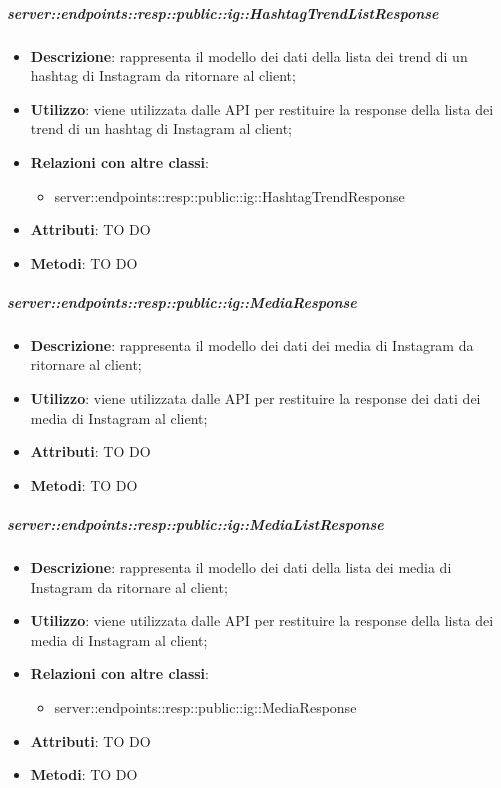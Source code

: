     \subparagraph{server::endpoints::resp::public::ig::HashtagTrendListResponse} %
    \label{subp:bdsm_app_server_endpoints_resp_public_ig_hashtagtrendlistresponse}
    \begin{itemize}
      \item \textbf{Descrizione}: rappresenta il modello dei dati della lista dei trend di un hashtag di Instagram da ritornare al client;
      \item \textbf{Utilizzo}: viene utilizzata dalle API per restituire la response della lista dei trend di un hashtag di Instagram al client;
      \item \textbf{Relazioni con altre classi}:
        \begin{itemize}
          \item server::endpoints::resp::public::ig::HashtagTrendResponse
        \end{itemize}
	  \item \textbf{Attributi}: TO DO
	  \item \textbf{Metodi}: TO DO
      \end{itemize}

    \subparagraph{server::endpoints::resp::public::ig::MediaResponse} %
    \label{subp:bdsm_app_server_endpoints_resp_public_ig_mediaresponse}
    \begin{itemize}
      \item \textbf{Descrizione}: rappresenta il modello dei dati dei media di Instagram da ritornare al client;
      \item \textbf{Utilizzo}: viene utilizzata dalle API per restituire la response dei dati dei media di Instagram al client;
      
	  \item \textbf{Attributi}: TO DO
	  \item \textbf{Metodi}: TO DO
      \end{itemize}

    \subparagraph{server::endpoints::resp::public::ig::MediaListResponse} %
    \label{subp:bdsm_app_server_endpoints_resp_public_ig_medialistresponse}
    \begin{itemize}
      \item \textbf{Descrizione}: rappresenta il modello dei dati della lista dei media di Instagram da ritornare al client;
      \item \textbf{Utilizzo}: viene utilizzata dalle API per restituire la response della lista dei media di Instagram al client;
      \item \textbf{Relazioni con altre classi}:
        \begin{itemize}
          \item server::endpoints::resp::public::ig::MediaResponse
        \end{itemize}
	  \item \textbf{Attributi}: TO DO
	  \item \textbf{Metodi}: TO DO
      \end{itemize}


